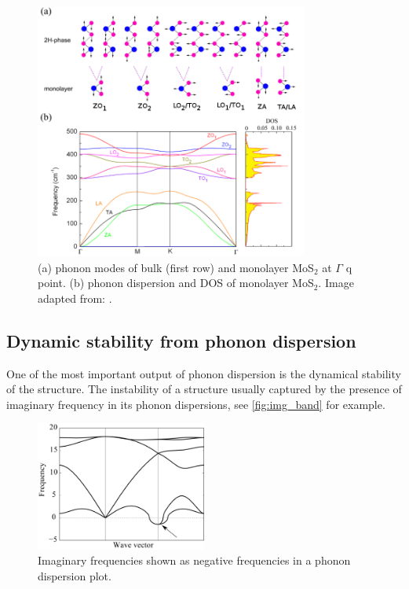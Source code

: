 \begin{figure}[htbp!] 
\centering  
\includegraphics[width=0.8\textwidth]{mos2_ph.png}
\caption{(a) phonon modes of bulk (first row) and monolayer MoS$_2$ at $\Gamma$ q point. (b) phonon dispersion and DOS of monolayer MoS$_2$. Image adapted from: \cite{Cai2014a}. }  
\label{fig:mos2_ph}
\end{figure} 


\subsection{Dynamic stability from phonon dispersion}

One of the most important output of phonon dispersion is the dynamical stability of the structure. The instability of a structure usually captured by the presence of imaginary frequency in its phonon dispersions, see \autoref{fig:img_band} for example. 


\begin{figure}[htbp!] 
\centering  
\includegraphics[width=0.5\textwidth]{img_band.png}
\caption{ Imaginary frequencies shown as negative frequencies in a phonon dispersion plot.}  
\label{fig:img_band}
\end{figure} 

